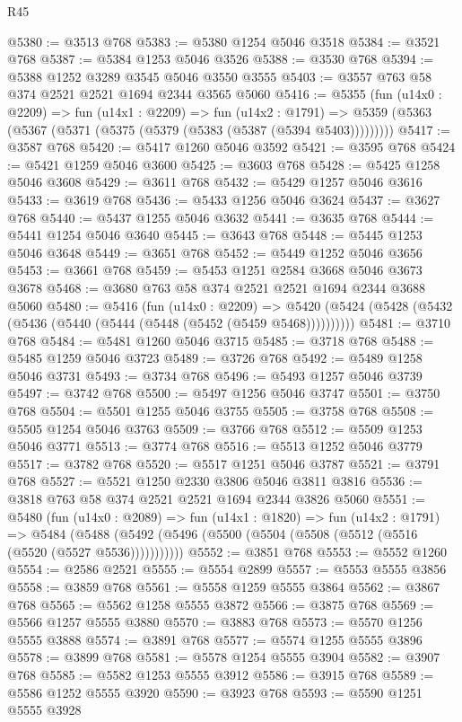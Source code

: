 \begin{lexlean}{R45}
\begin{coremodule}
@5380 := @3513 @768
@5383 := @5380 @1254 @5046 @3518
@5384 := @3521 @768
@5387 := @5384 @1253 @5046 @3526
@5388 := @3530 @768
@5394 := @5388 @1252 @3289 @3545 @5046 @3550 @3555
@5403 := @3557 @763 @58 @374 @2521 @2521 @1694 @2344 @3565 @5060
@5416 := @5355
    (fun (u14x0 : @2209) =>
    fun (u14x1 : @2209) =>
    fun (u14x2 : @1791) =>
    @5359 (@5363 (@5367 (@5371 (@5375 (@5379 (@5383 (@5387 (@5394 @5403)))))))))
@5417 := @3587 @768
@5420 := @5417 @1260 @5046 @3592
@5421 := @3595 @768
@5424 := @5421 @1259 @5046 @3600
@5425 := @3603 @768
@5428 := @5425 @1258 @5046 @3608
@5429 := @3611 @768
@5432 := @5429 @1257 @5046 @3616
@5433 := @3619 @768
@5436 := @5433 @1256 @5046 @3624
@5437 := @3627 @768
@5440 := @5437 @1255 @5046 @3632
@5441 := @3635 @768
@5444 := @5441 @1254 @5046 @3640
@5445 := @3643 @768
@5448 := @5445 @1253 @5046 @3648
@5449 := @3651 @768
@5452 := @5449 @1252 @5046 @3656
@5453 := @3661 @768
@5459 := @5453 @1251 @2584 @3668 @5046 @3673 @3678
@5468 := @3680 @763 @58 @374 @2521 @2521 @1694 @2344 @3688 @5060
@5480 := @5416
    (fun (u14x0 : @2209) =>
    @5420 (@5424 (@5428 (@5432 (@5436 (@5440 (@5444 (@5448 (@5452 (@5459 @5468))))))))))
@5481 := @3710 @768
@5484 := @5481 @1260 @5046 @3715
@5485 := @3718 @768
@5488 := @5485 @1259 @5046 @3723
@5489 := @3726 @768
@5492 := @5489 @1258 @5046 @3731
@5493 := @3734 @768
@5496 := @5493 @1257 @5046 @3739
@5497 := @3742 @768
@5500 := @5497 @1256 @5046 @3747
@5501 := @3750 @768
@5504 := @5501 @1255 @5046 @3755
@5505 := @3758 @768
@5508 := @5505 @1254 @5046 @3763
@5509 := @3766 @768
@5512 := @5509 @1253 @5046 @3771
@5513 := @3774 @768
@5516 := @5513 @1252 @5046 @3779
@5517 := @3782 @768
@5520 := @5517 @1251 @5046 @3787
@5521 := @3791 @768
@5527 := @5521 @1250 @2330 @3806 @5046 @3811 @3816
@5536 := @3818 @763 @58 @374 @2521 @2521 @1694 @2344 @3826 @5060
@5551 := @5480
    (fun (u14x0 : @2089) =>
    fun (u14x1 : @1820) =>
    fun (u14x2 : @1791) =>
    @5484 (@5488 (@5492 (@5496 (@5500 (@5504 (@5508 (@5512 (@5516 (@5520 (@5527 @5536)))))))))))
@5552 := @3851 @768
@5553 := @5552 @1260
@5554 := @2586 @2521
@5555 := @5554 @2899
@5557 := @5553 @5555 @3856
@5558 := @3859 @768
@5561 := @5558 @1259 @5555 @3864
@5562 := @3867 @768
@5565 := @5562 @1258 @5555 @3872
@5566 := @3875 @768
@5569 := @5566 @1257 @5555 @3880
@5570 := @3883 @768
@5573 := @5570 @1256 @5555 @3888
@5574 := @3891 @768
@5577 := @5574 @1255 @5555 @3896
@5578 := @3899 @768
@5581 := @5578 @1254 @5555 @3904
@5582 := @3907 @768
@5585 := @5582 @1253 @5555 @3912
@5586 := @3915 @768
@5589 := @5586 @1252 @5555 @3920
@5590 := @3923 @768
@5593 := @5590 @1251 @5555 @3928

\end{coremodule}
\end{lexlean}
